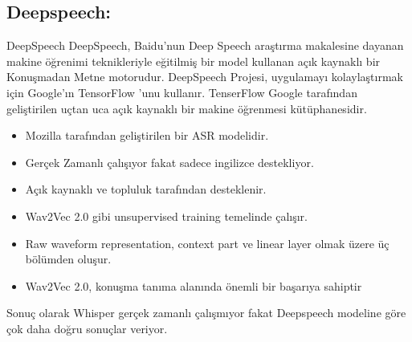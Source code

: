 \documentclass{article}
\begin{document}
	\subsection{Deepspeech:}
		DeepSpeech DeepSpeech, Baidu'nun Deep Speech araştırma makalesine \cite{DBLP:journals/corr/HannunCCCDEPSSCN14} dayanan makine öğrenimi teknikleriyle eğitilmiş bir model kullanan açık kaynaklı bir Konuşmadan Metne motorudur. DeepSpeech Projesi, uygulamayı kolaylaştırmak için Google'ın TensorFlow 'unu kullanır. TenserFlow Google tarafından geliştirilen uçtan uca açık kaynaklı bir makine öğrenmesi kütüphanesidir.
	\begin{itemize}
		\item Mozilla tarafından geliştirilen bir ASR modelidir.
		\item Gerçek Zamanlı çalışıyor fakat sadece ingilizce destekliyor.
		\item Açık kaynaklı ve topluluk tarafından desteklenir. 
		\item Wav2Vec 2.0 gibi unsupervised training temelinde çalışır.
		\item Raw waveform representation, context part ve linear layer olmak üzere üç bölümden oluşur.
		\item Wav2Vec 2.0, konuşma tanıma alanında önemli bir başarıya sahiptir \\
	\end{itemize}
	Sonuç olarak Whisper gerçek zamanlı çalışmıyor fakat Deepspeech modeline göre çok daha doğru sonuçlar veriyor.
	
	
\end{document}
